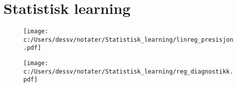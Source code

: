\chapter{Statistisk learning} 
\begin{figure} 
\texttt{[image: c:/Users/dessv/notater/Statistisk\_learning/linreg\_presisjon.pdf]} 
\end{figure} 
\begin{figure} 
\texttt{[image: c:/Users/dessv/notater/Statistisk\_learning/reg\_diagnostikk.pdf]} 
\end{figure} 
